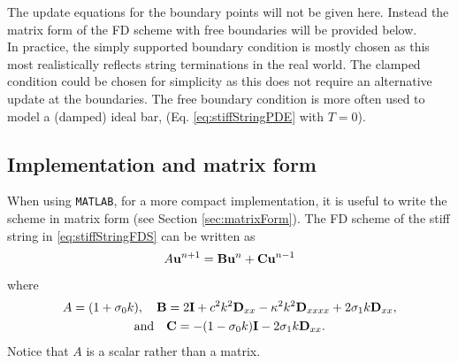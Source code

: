 The update equations for the boundary points will not be given here. Instead the matrix form of the FD scheme with free boundaries will be provided below. 
\\

In practice, the simply supported boundary condition is mostly chosen as this most realistically reflects string terminations in the real world. The clamped condition could be chosen for simplicity as this does not require an alternative update at the boundaries. The free boundary condition is more often used to model a (damped) ideal bar, (Eq. \eqref{eq:stiffStringPDE} with $T = 0$).

\subsection{Implementation and matrix form}\label{sec:implementationStiffString}
When using \texttt{MATLAB}, for a more compact implementation, it is useful to write the scheme in matrix form (see Section \ref{sec:matrixForm}). The FD scheme of the stiff string in \eqref{eq:stiffStringFDS} can be written as 
\begin{equation}\label{eq:matrixFormStiffString}
    A\mathbf{u}^{n+1} = \mathbf{B}\mathbf{u}^n + \mathbf{C} \mathbf{u}^{n-1}
\end{equation}
where 
\begin{equation*}
    \begin{gathered}
    A = (1+\sigma_{0} k), \quad \mathbf{B} = 2\mathbf{I} + c^2 k^2 \mathbf{D}_{xx} - \kappa^2 k^2 \mathbf{D}_{xxxx} + 2 \sigma_{1} k \mathbf{D}_{xx}, \\
    \text{and} \quad \mathbf{C} = -(1-\sigma_{0} k)\mathbf{I} - 2\sigma_{1} k \mathbf{D}_{xx}.
    \end{gathered}
\end{equation*}
Notice that $A$ is a scalar rather than a matrix.

